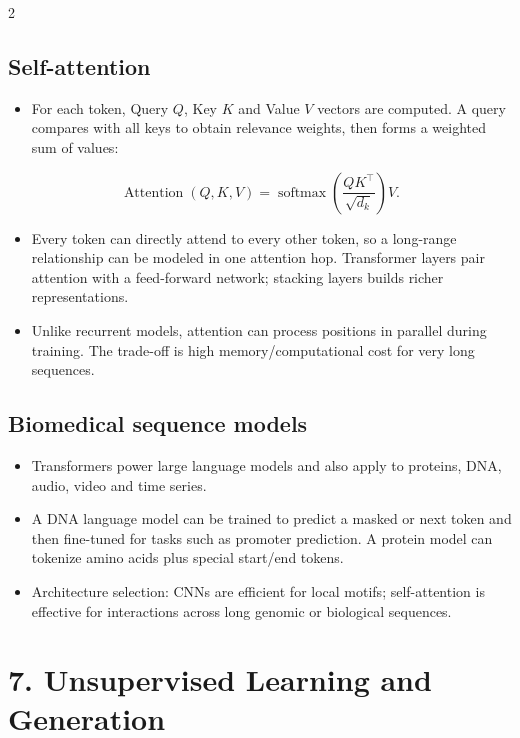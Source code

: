 \documentclass[10pt,a4paper]{ctexart}
\newcommand{\formula}[1]{%
  \par\vspace{1pt}\begingroup
  \setlength{\abovedisplayskip}{0pt}\setlength{\belowdisplayskip}{0pt}
  \[ #1 \]\endgroup\vspace{1pt}}
\begin{document}
\begin{multicols*}{2}
\subsection{Self-attention}
\begin{itemize}
  \item For each token, Query \(Q\), Key \(K\) and Value \(V\) vectors are computed. A query compares with all keys to obtain relevance weights, then forms a weighted sum of values:
\end{itemize}
\formula{\operatorname{Attention}(Q,K,V)=
\operatorname{softmax}\!\left(\frac{QK^\top}{\sqrt{d_k}}\right)V.}
\begin{itemize}
  \item Every token can directly attend to every other token, so a long-range relationship can be modeled in one attention hop. Transformer layers pair attention with a feed-forward network; stacking layers builds richer representations.
  \item Unlike recurrent models, attention can process positions in parallel during training. The trade-off is high memory/computational cost for very long sequences.
\end{itemize}

\subsection{Biomedical sequence models}
\begin{itemize}
  \item Transformers power large language models and also apply to proteins, DNA, audio, video and time series.
  \item A DNA language model can be trained to predict a masked or next token and then fine-tuned for tasks such as promoter prediction. A protein model can tokenize amino acids plus special start/end tokens.
  \item Architecture selection: CNNs are efficient for local motifs; self-attention is effective for interactions across long genomic or biological sequences.
\end{itemize}


\section{7. Unsupervised Learning and Generation}

\end{multicols*}
\end{document}
